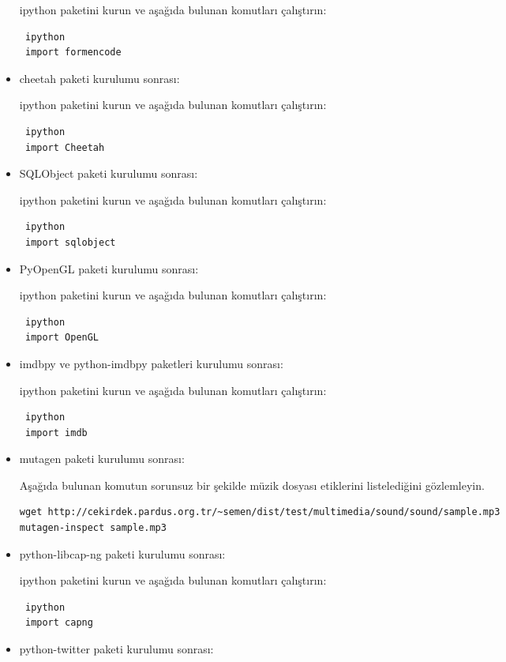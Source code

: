 \documentclass[a4paper,10pt]{article}
\begin{document}
\begin{itemize}
ipython paketini kurun ve aşağıda bulunan komutları çalıştırın:
\begin{verbatim}
 ipython
 import formencode
\end{verbatim}

\item cheetah  paketi kurulumu sonrası:

ipython paketini kurun ve aşağıda bulunan komutları çalıştırın:
\begin{verbatim}
 ipython
 import Cheetah
\end{verbatim}


\item SQLObject  paketi kurulumu sonrası:

ipython paketini kurun ve aşağıda bulunan komutları çalıştırın:
\begin{verbatim}
 ipython
 import sqlobject
\end{verbatim}

\item PyOpenGL  paketi kurulumu sonrası:

ipython paketini kurun ve aşağıda bulunan komutları çalıştırın:
\begin{verbatim}
 ipython
 import OpenGL
\end{verbatim}

\item imdbpy ve python-imdbpy  paketleri kurulumu sonrası:

ipython paketini kurun ve aşağıda bulunan komutları çalıştırın:
\begin{verbatim}
 ipython
 import imdb
\end{verbatim}

\item mutagen  paketi kurulumu sonrası:

Aşağıda bulunan komutun sorunsuz bir şekilde müzik dosyası etiklerini listelediğini gözlemleyin.
\begin{verbatim}
wget http://cekirdek.pardus.org.tr/~semen/dist/test/multimedia/sound/sound/sample.mp3 
mutagen-inspect sample.mp3
\end{verbatim}


\item python-libcap-ng  paketi kurulumu sonrası:

ipython paketini kurun ve aşağıda bulunan komutları çalıştırın:
\begin{verbatim}
 ipython
 import capng
\end{verbatim}

\item python-twitter paketi kurulumu sonrası:


\end{itemize}
\end{document}
